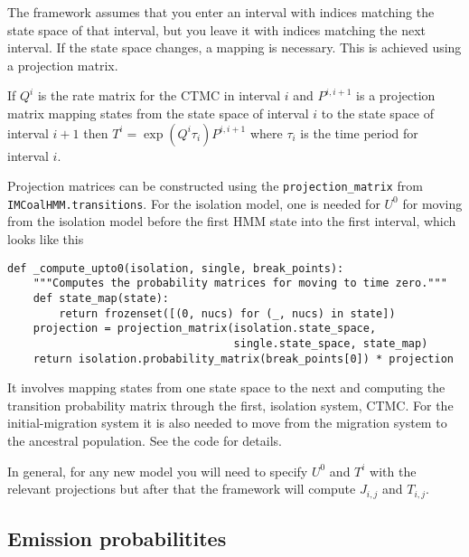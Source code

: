 \documentclass[11pt]{article}
\begin{document}
The framework assumes that you enter an interval with indices matching the state space of that interval, but you leave it with indices matching the next interval. If the state space changes, a mapping is necessary. This is achieved using a projection matrix.

If $Q^i$ is the rate matrix for the CTMC in interval $i$ and $P^{i,i+1}$ is a projection matrix mapping states from the state space of interval $i$ to the state space of interval $i+1$ then $T^i = \exp(Q^i\tau_i)P^{i,i+1}$ where $\tau_i$ is the time period for interval $i$.

Projection matrices can be constructed using the \texttt{projection\_matrix} from \texttt{IMCoalHMM.transitions}. For the isolation model, one is needed for $U^0$ for moving from the isolation model before the first HMM state into the first interval, which looks like this

\begin{verbatim}
def _compute_upto0(isolation, single, break_points):
    """Computes the probability matrices for moving to time zero."""
    def state_map(state):
        return frozenset([(0, nucs) for (_, nucs) in state])
    projection = projection_matrix(isolation.state_space, 
                                   single.state_space, state_map)
    return isolation.probability_matrix(break_points[0]) * projection
\end{verbatim}

It involves mapping states from one state space to the next and computing the transition probability matrix through the first, isolation system, CTMC. For the initial-migration system it is also needed to move from the migration system to the ancestral population. See the code for details.

In general, for any new model you will need to specify $U^0$ and $T^i$ with the relevant projections but after that the framework will compute $J_{i,j}$ and $T_{i,j}$.






\subsection{Emission probabilitites}




\end{document}
